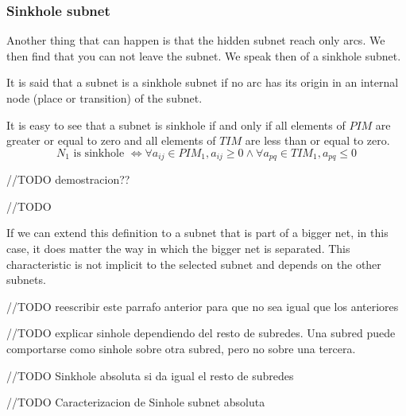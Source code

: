 {\subsubsection{Sinkhole subnet}

Another thing that can happen is that the hidden subnet reach only arcs. We then find that you can not leave the subnet. We speak then of a sinkhole
subnet.

\begin{definition}
It is said that a subnet is a sinkhole subnet if no arc has its origin in an internal node (place or transition) of the subnet.
\end{definition}

It is easy to see that a subnet is sinkhole if and only if all elements of $PIM$ are greater or equal to zero and all elements of $TIM$ are less than or equal to zero.
\[
N_1\mbox{ is sinkhole } \iff \forall a_{ij} \in PIM_{1}, a_{ij} \geq
0 \land \forall a_{pq} \in TIM_{1}, a_{pq} \leq 0
\]

//TODO demostracion??

\begin{example}
//TODO
\end{example}

If we can extend this definition to a subnet that is part of a bigger net,
in this case, it does matter the way in which the bigger net is separated. This characteristic is not implicit to the selected subnet and depends on the other subnets.

//TODO reescribir este parrafo anterior para que no sea
igual que los anteriores

//TODO explicar sinhole dependiendo del resto de subredes. Una subred puede comportarse como sinhole sobre otra subred, pero no sobre una tercera.

//TODO Sinkhole absoluta si da igual el resto de subredes

//TODO Caracterizacion de Sinhole subnet absoluta

}
